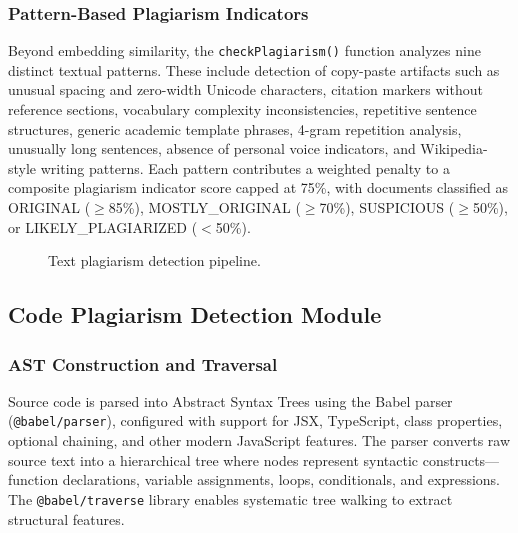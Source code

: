 \documentclass[10pt,twocolumn]{article}
\begin{document}
\subsubsection{Pattern-Based Plagiarism Indicators}
Beyond embedding similarity, the \texttt{checkPlagiarism()} function analyzes nine distinct textual patterns. These include detection of copy-paste artifacts such as unusual spacing and zero-width Unicode characters, citation markers without reference sections, vocabulary complexity inconsistencies, repetitive sentence structures, generic academic template phrases, 4-gram repetition analysis, unusually long sentences, absence of personal voice indicators, and Wikipedia-style writing patterns. Each pattern contributes a weighted penalty to a composite plagiarism indicator score capped at 75\%, with documents classified as ORIGINAL ($\geq$85\%), MOSTLY\_ORIGINAL ($\geq$70\%), SUSPICIOUS ($\geq$50\%), or LIKELY\_PLAGIARIZED ($<$50\%).

\begin{figure}[htbp]
\centering
\vspace{4cm}
\caption{Text plagiarism detection pipeline.}
\label{fig:textpipeline}
\end{figure}

\subsection{Code Plagiarism Detection Module}

\subsubsection{AST Construction and Traversal}
Source code is parsed into Abstract Syntax Trees using the Babel parser (\texttt{@babel/parser}), configured with support for JSX, TypeScript, class properties, optional chaining, and other modern JavaScript features. The parser converts raw source text into a hierarchical tree where nodes represent syntactic constructs---function declarations, variable assignments, loops, conditionals, and expressions. The \texttt{@babel/traverse} library enables systematic tree walking to extract structural features.
\end{document}
